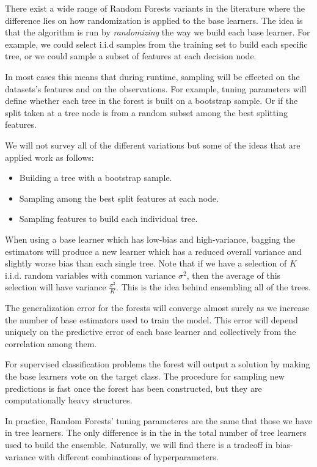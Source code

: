 There exist a wide range of Random Forests variants in the literature \cite{breiman-randomforests} where the difference lies on how randomization is applied to the base learners. The idea is that the algorithm is run by \textit{randomizing } the way we build each base learner. For example, we could select i.i.d samples from the training set to build each specific tree, or we could sample a subset of features at each decision node.

In most cases this means that during runtime, sampling will be effected on the datasets's features and on the observations. For example, tuning parameters will define whether each tree in the forest is built on a bootstrap sample. Or if the split taken at a tree node is from a random subset among the best splitting features.

We will not survey all of the different variations but some of the ideas that are applied work as follows:

\begin{itemize}
	\item Building a tree with a bootstrap sample.
	\item Sampling among the best split features at each node.
	\item Sampling features to build each individual tree.
\end{itemize}

When using a base learner which has low-bias and high-variance, bagging the estimators will produce a new learner which has a reduced overall variance and slightly worse bias than each single tree. Note that if we have a selection of $K$ i.i.d. random variables with common variance $\sigma^2$, then the average of this selection will have variance $\frac{\sigma^2}{K}$. This is the idea behind ensembling all of the trees.

The generalization error for the forests will converge almost surely as we increase the number of base estimators used to train the model. This error will depend uniquely on the predictive error of each base learner and collectively from the correlation among them.

For supervised classification problems the forest will output a solution by making the base learners vote on the  target class. The procedure for sampling new predictions is fast once the forest has been constructed, but they are computationally heavy structures.

In practice, Random Forests' tuning parameteres are the same that those we have in tree learners. The only difference is in the in the total number of tree learners used to build the ensemble. Naturally, we will find there is a tradeoff in bias-variance with different  combinations of hyperparameters. 


\textit{}

\textit{}

\textit{}

\textit{}